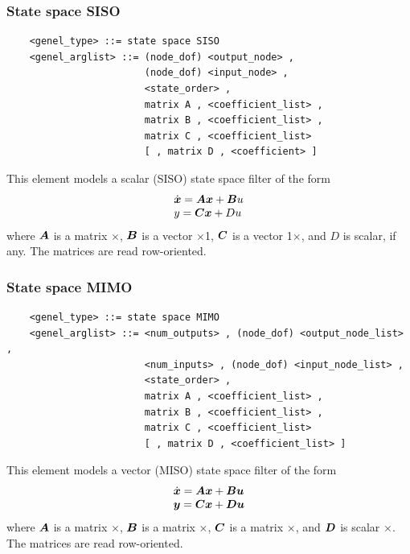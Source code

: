 \subsubsection{State space SISO}
\begin{verbatim}
    <genel_type> ::= state space SISO
    <genel_arglist> ::= (node_dof) <output_node> ,
                        (node_dof) <input_node> ,
                        <state_order> ,
                        matrix A , <coefficient_list> ,
                        matrix B , <coefficient_list> ,
                        matrix C , <coefficient_list>
                        [ , matrix D , <coefficient> ]
\end{verbatim}
This element models a scalar (SISO) state space filter of the form
\begin{displaymath}
    \begin{array}{l}  
        \dot{\boldsymbol{x}} = \boldsymbol{A}\boldsymbol{x}+\boldsymbol{B}u \\
	y = \boldsymbol{C}\boldsymbol{x}+Du
     \end{array}
\end{displaymath}
where $ \boldsymbol{A} $ is a matrix $\times$,
$ \boldsymbol{B} $ is a vector $\times$1,
$ \boldsymbol{C} $ is a vector 1$\times$,
and $ D $ is scalar, if any.
The matrices are read row-oriented.

\subsubsection{State space MIMO}
\begin{verbatim}
    <genel_type> ::= state space MIMO
    <genel_arglist> ::= <num_outputs> , (node_dof) <output_node_list> ,
                        <num_inputs> , (node_dof) <input_node_list> ,
                        <state_order> ,
                        matrix A , <coefficient_list> ,
                        matrix B , <coefficient_list> ,
                        matrix C , <coefficient_list>
                        [ , matrix D , <coefficient_list> ]
\end{verbatim}
This element models a vector (MISO) state space filter of the form
\begin{displaymath}
    \begin{array}{l}  
        \dot{\boldsymbol{x}} = \boldsymbol{A}\boldsymbol{x}+\boldsymbol{B}\boldsymbol{u} \\
	\boldsymbol{y} = \boldsymbol{C}\boldsymbol{x}+\boldsymbol{D}\boldsymbol{u}
     \end{array}
\end{displaymath}
where $ \boldsymbol{A} $ is a matrix $\times$,
$ \boldsymbol{B} $ is a matrix $\times$,
$ \boldsymbol{C} $ is a matrix $\times$,
and $ \boldsymbol{D} $ is scalar $\times$.
The matrices are read row-oriented.




